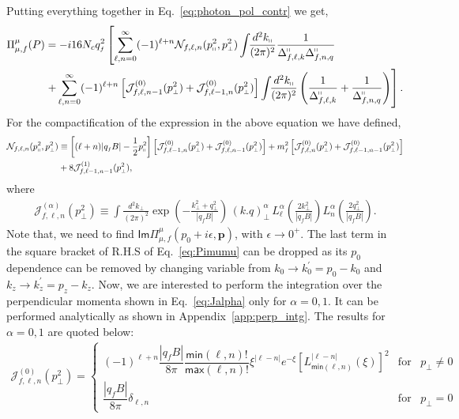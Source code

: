\documentclass[aps,prd,floatfix,showpacs,showkeys,superscriptadress,unsortedaddress,nofootinbib,onecolumn]{revtex4-1}
\newcommand{\sF}{\scriptscriptstyle{f}}
\newcommand{\sperp}{\scriptscriptstyle{\perp}}
\newcommand{\shp}{\shortparallel}
\newcommand{\nn}{\nonumber \\}
\begin{document}
Putting everything together in Eq.~\eqref{eq:photon_pol_contr} we get,
\begin{align}
\Pi^{\mu}_{\mu,f}(P) &= -i16N_cq_{\sF}^2\left[\sum_{\ell,n = 0}^{\infty}(-1)^{\ell+n}\mathcal{N}_{f,\ell,n}(p_{\shp}^2,p_{\sperp}^2)\int\!\!\frac{d^2k_{\shp}}{(2\pi)^2}\frac{1}{\Delta_{f,\ell,k}^{\shp}\Delta_{f,n,q}^{\shp}} \right. \nn
&\left.+\sum_{\ell,n=0}^{\infty}(-1)^{\ell+n}\left[\mathcal{J}^{(0)}_{f,\ell,n-1}(p_{\sperp}^2)+\mathcal{J}^{(0)}_{f,\ell-1,n}(p_{\sperp}^2)\right]\int\!\!\frac{d^2k_{\shp}}{(2\pi)^2}\left(\frac{1}{\Delta_{f,\ell,k}^{\shp}}+\frac{1}{\Delta_{f,n,q}^{\shp}}\right)\right].  \label{eq:Pimumu}
\end{align}
For the compactification of the expression in the above equation we have defined,
\begin{align}
\mathcal{N}_{f,\ell,n}(p_{\shp}^2,p_{\sperp}^2) &\equiv \left[(\ell+n)|q_{\sF}B|-\frac{1}{2}p_{\shp}^2\right]\left[\mathcal{J}^{(0)}_{f,\ell-1,n}(p_{\sperp}^2) + \mathcal{J}^{(0)}_{f,\ell,n-1}(p_{\sperp}^2)\right]+m_{\sF}^2\left[\mathcal{J}^{(0)}_{f,\ell,n}(p_{\sperp}^2)
+\mathcal{J}^{(0)}_{f,\ell-1,n-1}(p_{\sperp}^2)\right]\nn
&+8\mathcal{J}_{f,\ell-1,n-1}^{(1)}(p_{\sperp}^2),
\end{align}
where 
\begin{align}
\mathcal{J}^{(\alpha)}_{f,\ell,n}(p_{\sperp}^2) \equiv \int\!\!\frac{d^2k_{\sperp}}{(2\pi)^2}\exp\left(-\frac{k_{\sperp}^2+q_{\sperp}^2}{|q_{\sF}B|}\right)\,(k.q)_{\sperp}^{\alpha}\,L_{\ell}^{\alpha}\left(\frac{2k_{\sperp}^2}{|q_{\sF}B|}\right)L_{n}^{\alpha}\left(\frac{2q_{\sperp}^2}{|q_{\sF}B|}\right). \label{eq:Jalpha}
\end{align}
Note that, we need to find $\textsf{Im}\Pi^{\mu}_{\mu,f}(p_0+i\epsilon,\bm{p})$, with $\epsilon\rightarrow 0^{+}$. The last term in the square bracket of R.H.S of Eq.~\eqref{eq:Pimumu} can be dropped as its $p_0$ dependence can be removed by changing variable from $k_0\rightarrow k_0^{\prime}=p_0-k_0$ and $k_z\rightarrow k_z^{\prime}=p_z-k_z$.
Now,  we are interested to perform the integration over the perpendicular momenta shown in Eq.~\eqref{eq:Jalpha} only for $\alpha =0,1$. It can be performed analytically as shown in Appendix~\ref{app:perp_intg}. The results for $\alpha =0, 1$ are quoted below:
\begin{align}
\mathcal{J}^{(0)}_{f,\ell,n}(p_{\sperp}^2) = 
\begin{cases}
(-1)^{\ell+n}\dfrac{|q_{\sF}B|}{8\pi}\dfrac{\textsf{min}(\ell,n)!}{\textsf{max}(\ell,n)!}\xi^{|\ell-n|}e^{-\xi}\left[L_{\textsf{min}(\ell,n)}^{|\ell-n|}(\xi)\right]^2 & \text{for  } \,\,\,p_{\sperp}\neq 0\\
\dfrac{|q_{\sF}B|}{8\pi}\delta_{\ell, n} & \text{for  }\,\,\, p_{\sperp} = 0  
\end{cases} \label{eq:J0}
\end{align}
\end{document}
